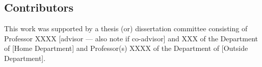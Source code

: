 

\begin{contributors}



%
%
% 
%
%
%
%
%

\subsection*{Contributors}
This work was supported by a thesis (or) dissertation committee consisting of Professor XXXX [advisor --– also note if co-advisor] and XXX of the Department of [Home Department] and Professor(s) XXXX of the Department of [Outside Department].


\end{contributors}
